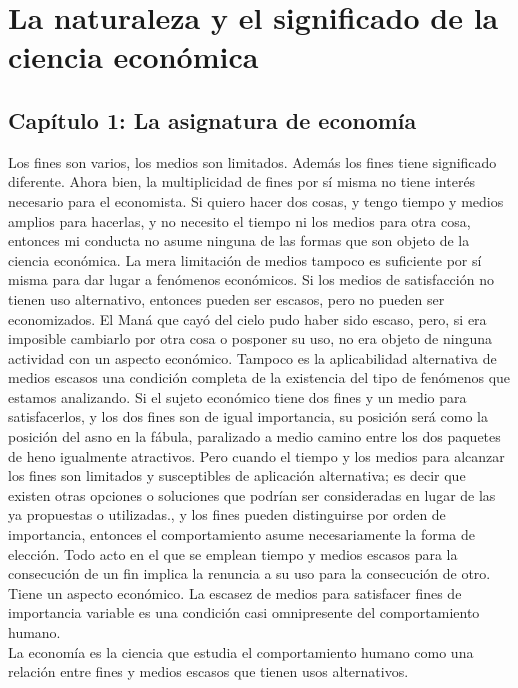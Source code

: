  \chapter{La naturaleza y el significado de la ciencia económica} 

 \section{Capítulo 1: La asignatura de economía}

 Los fines son varios, los medios son limitados. Además los fines tiene significado diferente. Ahora bien, la multiplicidad de fines por sí misma no tiene interés necesario para el economista. Si quiero hacer dos cosas, y tengo tiempo y medios amplios para hacerlas, y no necesito el tiempo ni los medios para otra cosa, entonces mi conducta no asume ninguna de las formas que son objeto de la ciencia económica. La mera limitación de medios tampoco es suficiente por sí misma para dar lugar a fenómenos económicos. Si los medios de satisfacción no tienen uso alternativo, entonces pueden ser escasos, pero no pueden ser economizados. El Maná que cayó del cielo pudo haber sido escaso, pero, si era imposible cambiarlo por otra cosa o posponer su uso, no era objeto de ninguna actividad con un aspecto económico. Tampoco es la aplicabilidad alternativa de medios escasos una condición completa de la existencia del tipo de fenómenos que estamos analizando. Si el sujeto económico tiene dos fines y un medio para satisfacerlos, y los dos fines son de igual importancia, su posición será como la posición del asno en la fábula, paralizado a medio camino entre los dos paquetes de heno igualmente atractivos. Pero cuando el tiempo y los medios para alcanzar los fines son limitados y susceptibles de aplicación alternativa; es decir que existen otras opciones o soluciones que podrían ser consideradas en lugar de las ya propuestas o utilizadas., y los fines pueden distinguirse por orden de importancia, entonces el comportamiento asume necesariamente la forma de elección. Todo acto en el que se emplean tiempo y medios escasos para la consecución de un fin implica la renuncia a su uso para la consecución de otro. Tiene un aspecto económico. La escasez de medios para satisfacer fines de importancia variable es una condición casi omnipresente del comportamiento humano. \\
 La economía es la ciencia que estudia el comportamiento humano como una relación entre fines y medios escasos que tienen usos alternativos.


